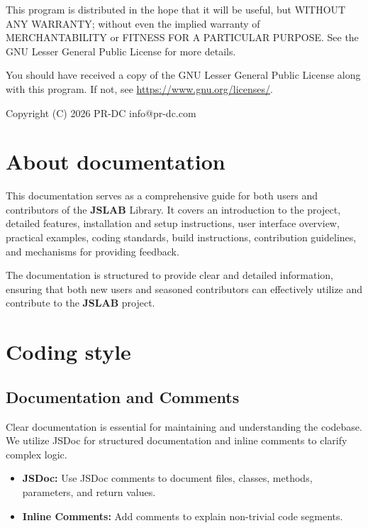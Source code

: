 \documentclass[12pt,a4paper]{article}
\newcommand{\yearvar}{2026}
\begin{document}
This program is distributed in the hope that it will be useful, but WITHOUT ANY WARRANTY; without even the implied warranty of MERCHANTABILITY or FITNESS FOR A PARTICULAR PURPOSE. See the GNU Lesser General Public License for more details.

You should have received a copy of the GNU Lesser General Public License along with this program. If not, see \url{https://www.gnu.org/licenses/}.

\vspace{5mm}

Copyright (C) \yearvar\; PR-DC info@pr-dc.com

\vspace{8mm}

\section{About documentation}

This documentation serves as a comprehensive guide for both users and contributors of the \textbf{JSLAB} Library. It covers an introduction to the project, detailed features, installation and setup instructions, user interface overview, practical examples, coding standards, build instructions, contribution guidelines, and mechanisms for providing feedback.

The documentation is structured to provide clear and detailed information, ensuring that both new users and seasoned contributors can effectively utilize and contribute to the \textbf{JSLAB} project.

\section{Coding style}
\label{coding-style}

\subsection{Documentation and Comments}

Clear documentation is essential for maintaining and understanding the codebase. We utilize JSDoc for structured documentation and inline comments to clarify complex logic.

\begin{itemize}
  \item \textbf{JSDoc:} Use JSDoc comments to document files, classes, methods, parameters, and return values.

  \item \textbf{Inline Comments:} Add comments to explain non-trivial code segments.
\end{itemize}
\end{document}
